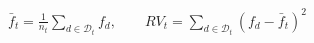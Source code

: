 \documentclass[11pt,border=2pt]{standalone}
\begin{document}
{\color{mathblue}$\displaystyle \bar f_t=\frac{1}{n_t}\sum_{d\in\mathcal D_t}f_d,\qquad RV_t=\sum_{d\in\mathcal D_t}\left(f_d-\bar f_t\right)^2$}
\end{document}
